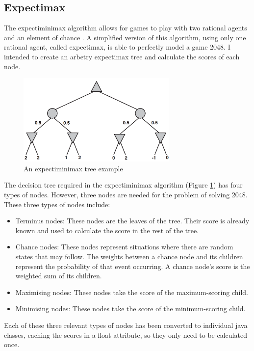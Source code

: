 \documentclass{article}
\begin{document}
\subsection{Expectimax}
The expectiminimax algorithm allows for games to play with two rational agents and an element of chance \cite[p.~200]{russell2010artificial}. A simplified version of this algorithm, using only one rational agent, called expectimax, is able to perfectly model a game 2048. I intended to create an arbetry expectimax tree and calculate the scores of each node.
\label{subsec:expectimax}
\begin{figure}
    \centering
    \includegraphics[width=0.7\textwidth]{expectimax.png}
    \caption{An expectiminimax tree example \cite[p.~200]{russell2010artificial}}
    \label{fig:expectree}
\end{figure}
The decision tree required in the expectiminimax algorithm (Figure \ref{fig:expectree}) has four types of nodes. However, three nodes are needed for the problem of solving 2048. These three types of nodes include:
\begin{itemize}
    \item Terminus nodes: These nodes are the leaves of the tree. Their score is already known and used to calculate the score in the rest of the tree.
     \item Chance nodes: These nodes represent situations where there are random states that may follow. The weights between
    a chance node and its children represent the probability of that event occurring. A chance node's score is the weighted sum of its children.
    \item Maximising nodes: These nodes take the score of the maximum-scoring child.
    \item Minimising nodes: These nodes take the score of the minimum-scoring child.
\end{itemize}
Each of these three relevant types of nodes has been converted to individual java classes, caching the scores in a float
attribute, so they only need to be calculated once.
\end{document}
